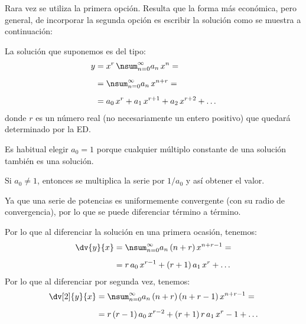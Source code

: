 Rara vez se utiliza la primera opción. Resulta que la forma más económica, pero general, de incorporar la segunda opción es escribir la solución como se muestra a continuación:
\par
La solución que suponemos es del tipo:
\begin{align}
\begin{aligned}
y &= x^{r} \, \nsum_{n=0}^{\infty} a_{n} \, x^{n} = \\[0.5em]
&= \nsum_{n=0}^{\infty} a_{n} \, x^{n+r} = \\[0.5em]
&= a_{0} \, x^{r} + a_{1} \, x^{r+1} + a_{2} \, x^{r+2} + \ldots
\end{aligned}
\label{eq:ecuacion_26_08}    
\end{align}
donde $r$ es un número real (no necesariamente un entero positivo) que quedará determinado por la ED.
\par
Es habitual elegir $a_{0} = 1$ porque cualquier múltiplo constante de una solución también es una solución.
\par
Si $a_{0} \neq 1$, entonces se multiplica la serie por $1/a_{0}$ y así obtener el valor.
\par
Ya que una serie de potencias es uniformemente convergente (con su radio de convergencia), por lo que se puede diferenciar término a término.
\par
Por lo que al diferenciar la solución en una primera ocasión, tenemos:
\begin{align}
\begin{aligned}
\dv{y}{x} &= \nsum_{n=0}^{\infty} a_{n} \, (n + r) \, x^{n+r-1} = \\[0.5em]
&= r \, a_{0} \, x^{r-1} + (r + 1) \, a_{1} \, x^{r} + \ldots
\end{aligned}
\label{eq:ecuacion_26_09a}
\end{align}
Por lo que al diferenciar por segunda vez, tenemos:
\begin{align}
\begin{aligned}
\dv[2]{y}{x} &= \nsum_{n=0}^{\infty} a_{n} \, (n + r) \, (n + r - 1) \, x^{n+r-1} = \\[0.5em]
&= r \, (r - 1) \, a_{0} \, x^{r-2} + (r + 1) \, r \, a_{1} \, x^{r}-1 + \ldots
\end{aligned}
\label{eq:ecuacion_26_09b}
\end{align}

